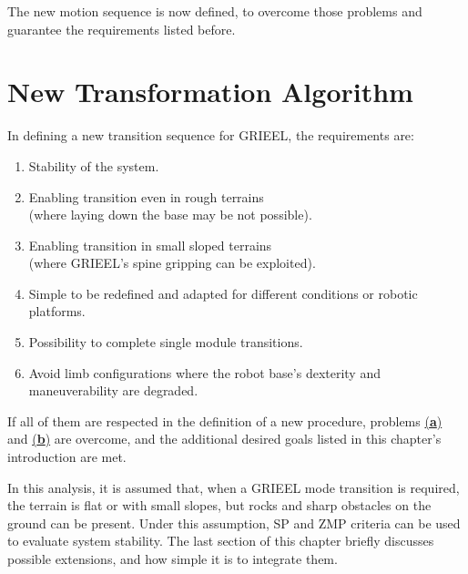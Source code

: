 The new motion sequence is now defined, to overcome those problems and guarantee the requirements listed before. 

\section{New Transformation Algorithm}
\label{sec:new_algorithm}

In defining a new transition sequence for GRIEEL, the requirements are: 
\begin{enumerate}
    \setlength\itemsep{-0.7em} 
    \item\label{item:stability} Stability of the system. 
    \item\label{item:rough} Enabling transition even in rough terrains\\(where laying down the base may be not possible). 
    \item\label{item:slopes} Enabling transition in small sloped terrains \\(where GRIEEL's spine gripping can be exploited).
    \item\label{item:reusability} Simple to be redefined and adapted for different conditions or robotic platforms. 
    \item\label{item:single} Possibility to complete single module transitions. 
    \item\label{item:dexterity} Avoid limb configurations where the robot base's dexterity and maneuverability are degraded. 
\end{enumerate}

If all of them are respected in the definition of a new procedure, problems \hyperref[item:problem_a]{(\textbf{a})} and \hyperref[item:problem_b]{(\textbf{b})} are overcome, and the additional desired goals listed in this chapter's introduction are met. 

In this analysis, it is assumed that, when a GRIEEL mode transition is required, the terrain is flat or with small slopes, but rocks and sharp obstacles on the ground can be present. Under this assumption, SP and ZMP criteria can be used to evaluate system stability. The last section of this chapter briefly discusses possible extensions, and how simple it is to integrate them.


